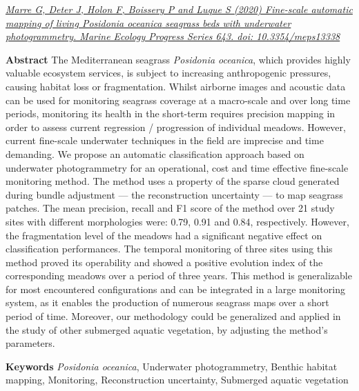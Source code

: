 \noindent\href{https://doi.org/10.3354/meps13338}{\textit{Marre G, Deter J, Holon F, Boissery P and Luque S (2020) Fine-scale automatic mapping of living \textit{Posidonia oceanica} seagrass beds with underwater photogrammetry. Marine Ecology Progress Series 643. doi: 10.3354/meps13338}}

\medskip

\noindent\textbf{Abstract}
The Mediterranean seagrass \textit{Posidonia oceanica}, which provides highly valuable ecosystem services, is subject to increasing anthropogenic pressures, causing habitat loss or fragmentation. Whilst airborne images and acoustic data can be used for monitoring seagrass coverage at a macro-scale and over long time periods, monitoring its health in the short-term requires precision mapping in order to assess current regression / progression of individual meadows. However, current fine-scale underwater techniques in the field are imprecise and time demanding. We propose an automatic classification approach based on underwater photogrammetry for an operational, cost and time effective fine-scale monitoring method. The method uses a property of the sparse cloud generated during bundle adjustment --- the reconstruction uncertainty --- to map seagrass patches. The mean precision, recall and F1 score of the method over 21 study sites with different morphologies were: 0.79, 0.91 and 0.84, respectively. However, the fragmentation level of the meadows had a significant negative effect on classification performances. The temporal monitoring of three sites using this method proved its operability and showed a positive evolution index of the corresponding meadows over a period of three years. This method is generalizable for most encountered configurations and can be integrated in a large monitoring system, as it enables the production of numerous seagrass maps over a short period of time. Moreover, our methodology could be generalized and applied in the study of other submerged aquatic vegetation, by adjusting the method’s parameters.

\medskip

\noindent\textbf{Keywords}
\textit{Posidonia oceanica}, Underwater photogrammetry, Benthic habitat mapping, Monitoring, Reconstruction uncertainty, Submerged aquatic vegetation

\newpage

